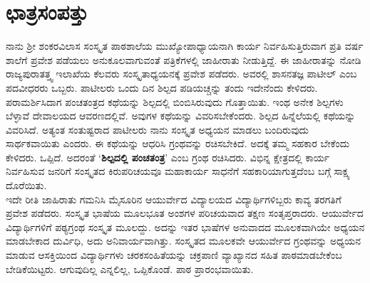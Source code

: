 {\section*{ಛಾತ್ರಸಂಪತ್ತು}

ನಾನು ಶ್ರೀ ಶಂಕರವಿಲಾಸ ಸಂಸ್ಕೃತ ಪಾಠಶಾಲೆಯ ಮುಖ್ಯೋಪಾಧ್ಯಾಯನಾಗಿ ಕಾರ್ಯ ನಿರ್ವಹಿಸುತ್ತಿರುವಾಗ ಪ್ರತಿ ವರ್ಷ ಶಾಲೆಗೆ ಪ್ರವೇಶ ಪಡೆಯಲು ಅನುಕೂಲವಾಗುವಂತೆ ಪತ್ರಿಕೆಗಳಲ್ಲಿ ಜಾಹೀರಾತು ನೀಡುತ್ತಿದ್ದೆ.  ಈ ಜಾಹೀರಾತನ್ನು ನೋಡಿ ರಾಜ್ಯಪುರಾತತ್ತ್ವ ಇಲಾಖೆಯ ಕೆಲವರು ಸಂಸ್ಕೃತಾಧ್ಯಯನಕ್ಕೆ ಪ್ರವೇಶ ಪಡೆದರು.  ಅವರಲ್ಲಿ ಶಾಸನತಜ್ಞ ಪಾಟೀಲ್ ಎಂಬ ಪದವೀಧರರು ಒಬ್ಬರು.  ಪಾಟೀಲರು ಒಂದು ದಿನ ಶಿಲ್ಪದ ಪಡಿಯಚ್ಚನ್ನು ತಂದು ಇದೇನೆಂದು ಕೇಳಿದರು.  ಪರಾಮರ್ಶಿಸಿದಾಗ ಪಂಚತಂತ್ರದ ಕಥೆಯನ್ನು ಶಿಲ್ಪದಲ್ಲಿ ಬಿಂಬಿಸಿರುವುದು ಗೊತ್ತಾಯಿತು.  ಇಂಥ ಅನೇಕ ಶಿಲ್ಪಗಳು ಬೆಳ್ಳಾವೆ ದೇವಾಲಯದ ಆವರಣದಲ್ಲಿವೆ.  ಅವುಗಳ ಕಥೆಯನ್ನು ವಿವರಿಸಬೇಕೆಂದರು.  ಶಿಲ್ಪದ ಹಿನ್ನೆಲೆಯಲ್ಲಿ ಕಥೆಯನ್ನು ವಿವರಿಸಿದೆ.  ಅತ್ಯಂತ ಸಂತುಷ್ಟರಾದ ಪಾಟೀಲರು ನಾನು ಸಂಸ್ಕೃತ ಅಧ್ಯಯನ ಮಾಡಲು ಬಂದಿರುವುದು ಸಾರ್ಥಕವಾಯಿತು ಎಂದರು.  ಈ ಕಥೆಯನ್ನು ಆಧರಿಸಿ ಗ್ರಂಥವನ್ನು ರಚಿಸಬೇಕಿದೆ.  ಅದಕ್ಕೆ  ತಮ್ಮ ಸಹಕಾರ ಬೇಕೆಂದು ಕೇಳಿದರು. ಒಪ್ಪಿದೆ.  ಅದರಂತೆ  ‘\textbf{ಶಿಲ್ಪದಲ್ಲಿ ಪಂಚತಂತ್ರ}’ ಎಂಬ ಗ್ರಂಥ ರಚಿಸಿದರು. ವಿಭಿನ್ನ ಕ್ಷೇತ್ರದಲ್ಲಿ ಕಾರ್ಯ ನಿರ್ವಹಿಸುವ ಜನರಿಗೆ ಸಂಸ್ಕೃತದ ಕಿರುಪರಿಚಯವೂ ಮಹಾಕಾರ್ಯ ಸಾಧನೆಗೆ ಸಹಕಾರಿಯಾಗುತ್ತದೆಂಬ ಬಗ್ಗೆ ಸಾಕ್ಷ್ಯ ದೊರೆಯಿತು.  
~\\[0.3cm]
ಇದೇ ರೀತಿ ಜಾಹಿರಾತು ಗಮನಿಸಿ ಮೈಸೂರಿನ ಆಯುರ್ವೇದ ವಿದ್ಯಾಲಯದ ವಿದ್ಯಾರ್ಥಿಗಳಿಬ್ಬರು ಕಾವ್ಯ ತರಗತಿಗೆ ಪ್ರವೇಶ ಪಡೆದರು.  ಸಂಸ್ಕೃತ ಭಾಷೆಯ ಮೂಲಭೂತ ಅಂಶಗಳ ಪರಿಚಯವಾದ ತಕ್ಷಣ ಸಂತೃಪ್ತರಾದರು.  ಆಯುರ್ವೇದ ವಿದ್ಯಾರ್ಥಿ\-ಗಳಿಗೆ ಪಠ್ಯಗ್ರಂಥ ಸಂಸ್ಕೃತ ಮೂಲದ್ದು.   ಅದನ್ನು ಇತರ ಭಾಷೆಗಳ ಅನುವಾದದ ಮೂಲಕವಾಗಿಯೇ ಅಧ್ಯಯನ ಮಾಡಬೇಕಾದ ದುರ್ವಿಧಿ, ಅದು ಅನಿವಾರ್ಯ\-ವಾಗಿತ್ತು. ಸಂಸ್ಕೃತದ ಮೂಲಕವೇ ಆಯುರ್ವೇದ ಗ್ರಂಥವನ್ನು ಅಧ್ಯಯನ ಮಾಡುವ ಆಸಕ್ತಿಯಿಂದ ವಿದ್ಯಾರ್ಥಿಗಳು ಚರಕಸಂಹಿತೆಯನ್ನು ಚಕ್ರಪಾಣಿ ವ್ಯಾಖ್ಯಾನದ ಸಹಿತ ಪಾಠಮಾಡಬೇಕೆಂಬ ಬೇಡಿಕೆಯಿಟ್ಟರು. ಆಗುವುದಿಲ್ಲ ಎನ್ನಲಿಲ್ಲ,  ಒಪ್ಪಿಕೊಂಡೆ.  ಪಾಠ ಪ್ರಾರಂಭ\-ವಾಯಿತು.
~\\[0.3cm]
}
